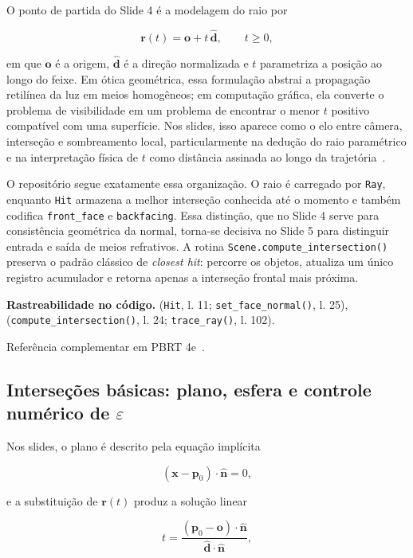 \documentclass[portuguese]{sbcreviews-2025}%
\newcommand{\slidescite}[2]{\citep[pp.~#2]{#1}}
\newcommand{\pbrtsecs}[1]{PBRT 4e~\citep[Se\c{c}\~oes~#1]{pharr2023pbrt}}
\begin{document}
O ponto de partida do Slide 4 é a modelagem do raio por

\[
\mathbf{r}(t)=\mathbf{o}+t\,\hat{\mathbf{d}},\qquad t\ge 0,
\]

em que $\mathbf{o}$ é a origem, $\hat{\mathbf{d}}$ é a direção normalizada e $t$ parametriza a posição ao longo do feixe. Em ótica geométrica, essa formulação abstrai a propagação retilínea da luz em meios homogêneos; em computação gráfica, ela converte o problema de visibilidade em um problema de encontrar o menor $t$ positivo compatível com uma superfície. Nos slides, isso aparece como o elo entre câmera, interseção e sombreamento local, particularmente na dedução do raio paramétrico e na interpretação física de $t$ como distância assinada ao longo da trajetória~\slidescite{inf2608slides04}{7--9}.

O repositório segue exatamente essa organização. O raio é carregado por \texttt{Ray}, enquanto \texttt{Hit} armazena a melhor interseção conhecida até o momento e também codifica \texttt{front\_face} e \texttt{backfacing}. Essa distinção, que no Slide 4 serve para consistência geométrica da normal, torna-se decisiva no Slide 5 para distinguir entrada e saída de meios refrativos. A rotina \texttt{Scene.compute\_intersection()} preserva o padrão clássico de \emph{closest hit}: percorre os objetos, atualiza um único registro acumulador e retorna apenas a interseção frontal mais próxima.

\noindent\textbf{Rastreabilidade no código.}  (\texttt{Hit}, l. 11; \texttt{set\_face\_normal()}, l. 25),  (\texttt{compute\_intersection()}, l. 24; \texttt{trace\_ray()}, l. 102).

Referência complementar em \pbrtsecs{1.2 e 3.5}.

\subsection{Interseções básicas: plano, esfera e controle numérico de $\varepsilon$}
\label{sec:slide4-intersecoes}

Nos slides, o plano é descrito pela equação implícita

\[
(\mathbf{x}-\mathbf{p}_0)\cdot\hat{\mathbf{n}}=0,
\]

e a substituição de $\mathbf{r}(t)$ produz a solução linear

\[
t=\frac{(\mathbf{p}_0-\mathbf{o})\cdot\hat{\mathbf{n}}}{\hat{\mathbf{d}}\cdot\hat{\mathbf{n}}},
\]
\end{document}
